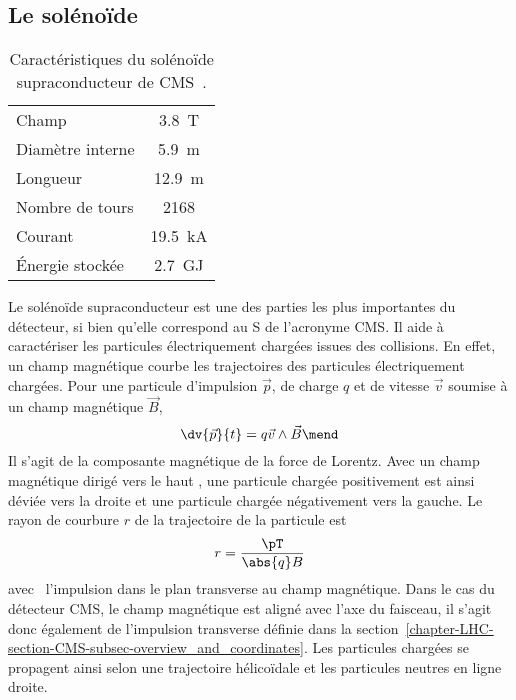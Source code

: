 \subsection{Le solénoïde}\label{chapter-LHC-section-CMS-subsec-solenoide}
\begin{wraptable}{R}{6cm}
\centering
\begin{tabular}{lc}
\toprule
Champ & \SI{3.8}{\tesla}\\
Diamètre interne & \SI{5.9}{\meter}\\
Longueur & \SI{12.9}{\meter}\\
Nombre de tours & \num{2168}\\
Courant & \SI{19.5}{\kilo\ampere}\\
Énergie stockée & \SI{2.7}{\giga\joule}\\
\bottomrule
\end{tabular}
\caption[Caractéristiques du solénoïde supraconducteur de CMS.]{Caractéristiques du solénoïde supraconducteur de CMS~\cite{CMS_TDR_1}.}
\label{tab-solenoid_properties}
\end{wraptable}
Le solénoïde supraconducteur est une des parties les plus importantes du détecteur, si bien qu'elle correspond au \og S \fg{} de l'acronyme CMS.
Il aide à caractériser les particules électriquement chargées issues des collisions.
En effet, un champ magnétique courbe les trajectoires des particules électriquement chargées.
Pour une particule d'impulsion $\vec{p}$, de charge $q$ et de vitesse $\vec{v}$ soumise à un champ magnétique $\vec{B}$,
\begin{equation}
\dv{\vec{p}}{t} = q \vec{v} \wedge \vec{B}
\mend
\end{equation}
Il s'agit de la composante magnétique de la force de Lorentz.
Avec un champ magnétique dirigé \og vers le haut \fg, une particule chargée positivement est ainsi déviée vers la droite et une particule chargée négativement vers la gauche.
Le rayon de courbure $r$ de la trajectoire de la particule est
\begin{equation}
r = \frac{\pT}{\abs{q}B}
\label{eq-chapter-LHC-section-CMS-subsec-solenoide-rayon_courbure}
\end{equation}
avec \pT\ l'impulsion dans le plan transverse au champ magnétique.
Dans le cas du détecteur CMS, le champ magnétique est aligné avec l'axe du faisceau, il s'agit donc également de l'impulsion transverse définie dans la section~\ref{chapter-LHC-section-CMS-subsec-overview_and_coordinates}.
Les particules chargées se propagent ainsi selon une trajectoire hélicoïdale et les particules neutres en ligne droite.
